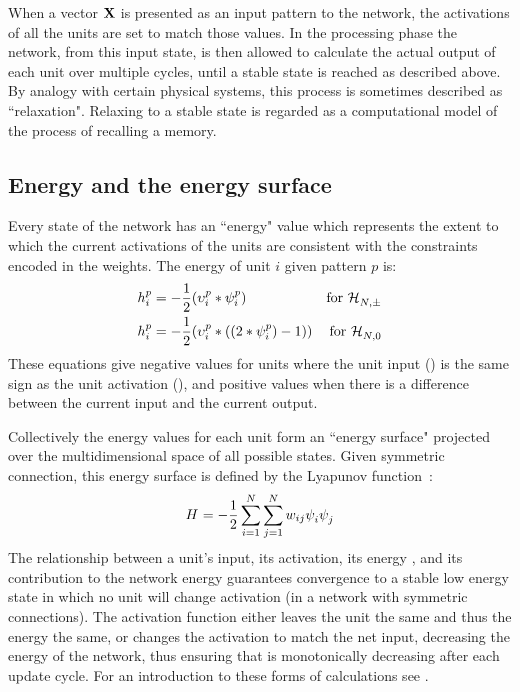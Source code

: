 When a vector $\mathbf{X}$ is presented as an input pattern to the network, the activations of all the units are set to match those values.  In the processing phase the network, from this input state, is then allowed to calculate the actual output of each unit over multiple cycles, until a stable state is reached as described above.  By analogy with certain physical systems, this process is sometimes described as ``relaxation".  Relaxing to a stable state is regarded as a computational model of the process of recalling a memory.  

\subsection{Energy and the energy surface}  %

Every state of the network has an ``energy" value which represents the extent to which the current activations of the units are consistent with the constraints encoded in the weights.    The energy  of unit $i$ given pattern $p$ is:
\begin{align}  
	\label{eq:unitEnergy}
	h_{i}^{p} &= -\frac{1}{2}(\upsilon_{i}^{p} * \psi_{i}^{p})   &\mbox{for}\ \mathcal{H}_{N,\pm}^{} \\
	h_{i}^{p} &= -\frac{1}{2}(\upsilon_{i}^{p} * ((2*\psi_{i}^{p})-1)) &\mbox{for}\ \mathcal{H}_{N,0}^{}
\end{align}
These equations give negative values for units where the unit input (\unitInput{}{}) is the same sign as the unit activation (\unitActivation{}{}), and positive values when there is a difference between the current input and the current output.

Collectively the energy values for each unit form an ``energy surface" projected over the multidimensional space of all possible states.   Given symmetric connection, this energy surface is defined by the Lyapunov function~\citep{Hopfield1982,Kuhn1991}: 
\begin{equation}
	\label{eq:energyNetwork}
	\displaystyle H^{}= -\frac{1}{2}\sum^{N}_{i=1}\sum^{N}_{j=1}w_{ij}\psi_{i}^{}\psi_{j}^{}
\end{equation}
The relationship between a unit's input, its activation, its energy ,  and its contribution to the network energy \energy{} guarantees convergence to a stable low energy state in which no unit will change activation (in a network with symmetric connections).  The activation function either leaves the unit the same and thus the energy the same, or changes the activation to match the net input, decreasing the energy of the network, thus ensuring that \energy{} is monotonically decreasing after each update cycle.  For an introduction to these forms of calculations see \citet{Hertz1991}. 

